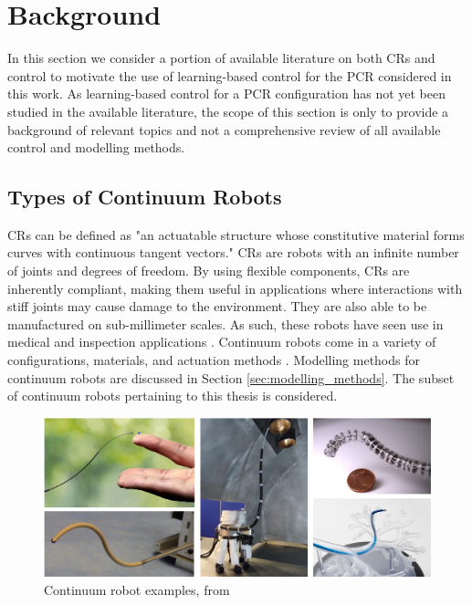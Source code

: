 \pagebreak
\section{Background}
\label{sec:background}
In this section we consider a portion of available literature on both CRs and control to motivate the use of learning-based control for the PCR considered in this work. As learning-based control for a PCR configuration has not yet been studied in the available literature, the scope of this section is only to provide a background of relevant topics and not a comprehensive review of all available control and modelling methods. 


\subsection{Types of Continuum Robots}
CRs can be defined as "an actuatable structure whose constitutive material forms curves with continuous tangent vectors." \cite{7314984} CRs are robots with an infinite number of joints and degrees of freedom. By using flexible components, CRs are inherently compliant, making them useful in applications where interactions with stiff joints may cause damage to the environment. They are also able to be manufactured on sub-millimeter scales. As such, these robots have seen use in medical and inspection applications \cite{7314984, DONG2017218, 4058827}. Continuum robots come in a variety of configurations, materials, and actuation methods \cite{doi:10.34133/2022/9754697}. Modelling methods for continuum robots are discussed in Section \ref{sec:modelling_methods}. The subset of continuum robots pertaining to this thesis is considered.  

\begin{figure}[H]
    \centering
    \includegraphics[width=\textwidth]{images/cr_examples.jpg}
    \caption{Continuum robot examples, from \cite{crl_cr_types}}
    \label{fig:cr_examples}
\end{figure}

